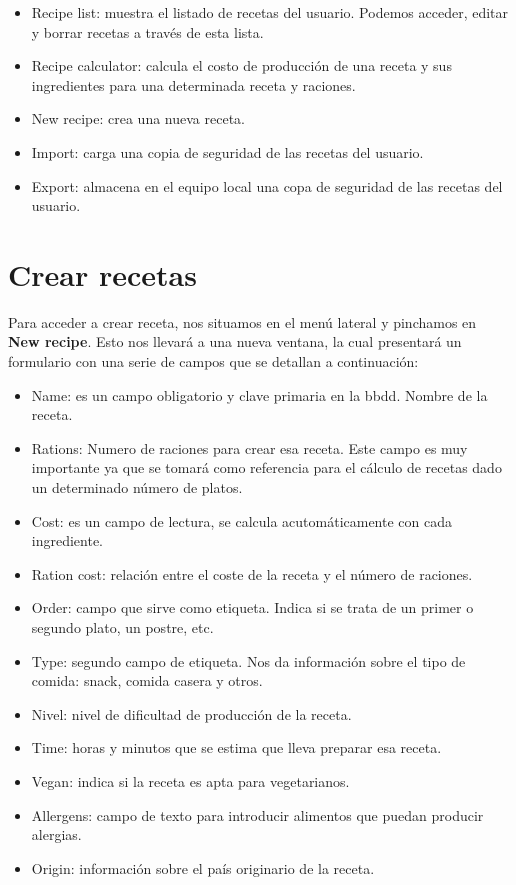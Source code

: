 \begin{itemize}
	\item Recipe list: muestra el listado de recetas del usuario. Podemos acceder, editar y borrar recetas a través de esta lista.
	\item Recipe calculator: calcula el costo de producción de una receta y sus ingredientes para una determinada receta y raciones.
	\item New recipe: crea una nueva receta.
	\item Import: carga una copia de seguridad de las recetas del usuario.
	\item Export: almacena en el equipo local una copa de seguridad de las recetas del usuario.
\end{itemize}


\vspace*{0.2in}
\section{Crear recetas}\label{cap.2.2}

\vspace*{0.1in}
Para acceder a crear receta, nos situamos en el menú lateral y pinchamos en \textbf{New recipe}. Esto nos llevará a una nueva ventana, la cual presentará un formulario con una serie de campos que se detallan a continuación:

\begin{itemize}
	\item Name: es un campo obligatorio y clave primaria en la bbdd. Nombre de la receta.
	\item Rations: Numero de raciones para crear esa receta. Este campo es muy importante ya que se tomará como referencia para el cálculo de recetas dado un determinado número de platos.
	\item Cost: es un campo de lectura, se calcula acutomáticamente con cada ingrediente.
	\item Ration cost: relación entre el coste de la receta y el número de raciones.
	\item Order: campo que sirve como etiqueta. Indica si se trata de un primer o segundo plato, un postre, etc.
	\item Type: segundo campo de etiqueta. Nos da información sobre el tipo de comida: snack, comida casera y otros.
	\item Nivel: nivel de dificultad de producción de la receta.
	\item Time: horas y minutos que se estima que lleva preparar esa receta.
	\item Vegan: indica si la receta es apta para vegetarianos.
	\item Allergens: campo de texto para introducir alimentos que puedan producir alergias.
	\item Origin: información sobre el país originario de la receta.
\end{itemize}

